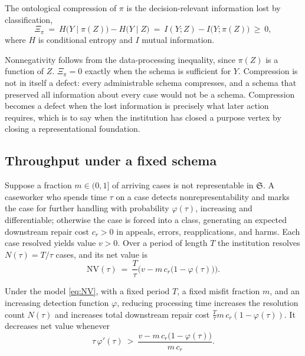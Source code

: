 \begin{definition}
The ontological compression of $\pi$ is the decision-relevant information lost by classification,
\begin{equation}
\Xi_\pi\ =\ H\big(Y\mid\pi(Z)\big)-H\big(Y\mid Z\big)\ =\ I(Y;Z)-I\big(Y;\pi(Z)\big)\ \geq\ 0,
\end{equation}
where $H$ is conditional entropy and $I$ mutual information.
\end{definition}

Nonnegativity follows from the data-processing inequality, since $\pi(Z)$ is a function of $Z$. $\Xi_\pi=0$ exactly when the schema is sufficient for $Y$. Compression is not in itself a defect: every administrable schema compresses, and a schema that preserved all information about every case would not be a schema. Compression becomes a defect when the lost information is precisely what later action requires, which is to say when the institution has closed a purpose vertex by closing a representational foundation.

\subsection{Throughput under a fixed schema}

Suppose a fraction $m\in(0,1]$ of arriving cases is not representable in $\mathfrak{S}$. A caseworker who spends time $\tau$ on a case detects nonrepresentability and marks the case for further handling with probability $\varphi(\tau)$, increasing and differentiable; otherwise the case is forced into a class, generating an expected downstream repair cost $c_r>0$ in appeals, errors, reapplications, and harms. Each case resolved yields value $v>0$. Over a period of length $T$ the institution resolves $N(\tau)=T/\tau$ cases, and its net value is
\begin{equation}\label{eq:NV}
\mathrm{NV}(\tau)\ =\ \frac{T}{\tau}\Big(v-m\,c_r\big(1-\varphi(\tau)\big)\Big).
\end{equation}

\begin{proposition}\label{prop:throughput}
Under the model \eqref{eq:NV}, with a fixed period $T$, a fixed misfit fraction $m$, and an increasing detection function $\varphi$, reducing processing time increases the resolution count $N(\tau)$ and increases total downstream repair cost $\frac{T}{\tau}m\,c_r(1-\varphi(\tau))$. It decreases net value whenever
\begin{equation}\label{eq:throughput-condition}
\tau\,\varphi'(\tau)\ >\ \frac{v-m\,c_r\big(1-\varphi(\tau)\big)}{m\,c_r}.
\end{equation}
\end{proposition}

